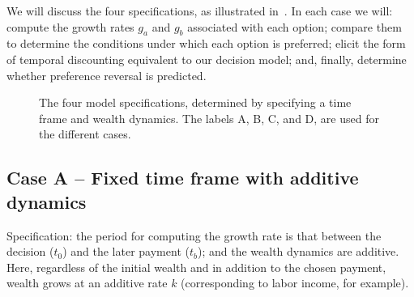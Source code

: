 We will discuss the four specifications, as illustrated in~. In each case we will: compute the growth rates $g_a$ and $g_b$ associated with each option; compare them to determine the conditions under which each option is preferred; elicit the form of temporal discounting equivalent to our decision model; and, finally, determine whether preference reversal is predicted.

\begin{figure}[!htb]
\centering
{}
\caption{The four model specifications, determined by specifying a time frame and wealth dynamics. The labels A, B, C, and D, are used for the different cases.}
\end{figure}


\subsection{Case A -- Fixed time frame with additive dynamics}\label{sec:case_C}

Specification: the period for computing the growth rate is that between the decision ($t_0$) and the later payment ($t_b$); and the wealth dynamics are additive. Here, regardless of the initial wealth and in addition to the chosen payment, wealth grows at an additive rate $k$ (corresponding to labor income, for example).

